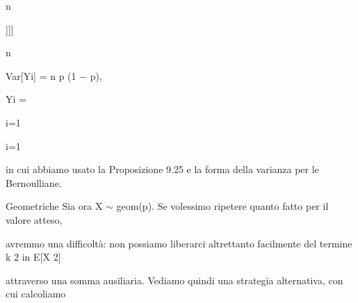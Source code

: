 \documentclass[a4paper,portrait,12pt]{article}
\begin{document}
\begin{flushleft}
n
\end{flushleft}





]]]





\begin{flushleft}
n
\end{flushleft}





\begin{flushleft}
Var[Yi] = n p (1 $-$ p),
\end{flushleft}





\begin{flushleft}
Yi =
\end{flushleft}


\begin{flushleft}
i=1
\end{flushleft}





\begin{flushleft}
i=1
\end{flushleft}





\begin{flushleft}
in cui abbiamo usato la Proposizione 9.25 e la forma della varianza per le Bernoulliane.
\end{flushleft}





\begin{flushleft}
Geometriche Sia ora X $\sim$ geom(p). Se volessimo ripetere quanto fatto per il valore atteso,
\end{flushleft}


\begin{flushleft}
avremmo una difficolt\`{a}: non possiamo liberarci altrettanto facilmente del termine k 2 in E[X 2]
\end{flushleft}


\begin{flushleft}
attraverso una somma ausiliaria. Vediamo quindi una strategia alternativa, con cui calcoliamo
\end{flushleft}
\end{document}
